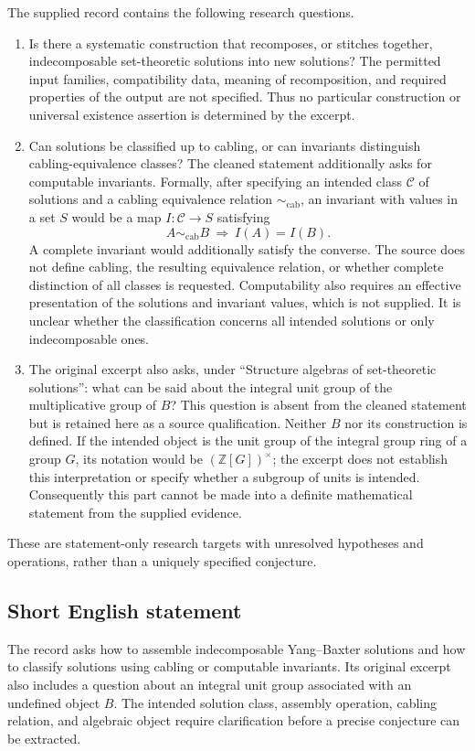 \documentclass[11pt]{article}
\begin{document}
The supplied record contains the following research questions.
\begin{enumerate}
\item Is there a systematic construction that recomposes, or stitches together, indecomposable set-theoretic solutions into new solutions? The permitted input families, compatibility data, meaning of recomposition, and required properties of the output are not specified. Thus no particular construction or universal existence assertion is determined by the excerpt.
\item Can solutions be classified up to cabling, or can invariants distinguish cabling-equivalence classes? The cleaned statement additionally asks for computable invariants. Formally, after specifying an intended class \(\mathcal C\) of solutions and a cabling equivalence relation \(\sim_{\mathrm{cab}}\), an invariant with values in a set \(S\) would be a map \(I:\mathcal C\to S\) satisfying
\[
A\sim_{\mathrm{cab}}B\ \Longrightarrow\ I(A)=I(B).
\]
A complete invariant would additionally satisfy the converse. The source does not define cabling, the resulting equivalence relation, or whether complete distinction of all classes is requested. Computability also requires an effective presentation of the solutions and invariant values, which is not supplied. It is unclear whether the classification concerns all intended solutions or only indecomposable ones.
\item The original excerpt also asks, under ``Structure algebras of set-theoretic solutions'': what can be said about the integral unit group of the multiplicative group of \(B\)? This question is absent from the cleaned statement but is retained here as a source qualification. Neither \(B\) nor its construction is defined. If the intended object is the unit group of the integral group ring of a group \(G\), its notation would be \((\mathbb Z[G])^\times\); the excerpt does not establish this interpretation or specify whether a subgroup of units is intended. Consequently this part cannot be made into a definite mathematical statement from the supplied evidence.
\end{enumerate}
These are statement-only research targets with unresolved hypotheses and operations, rather than a uniquely specified conjecture.
\subsection{Short English statement}
The record asks how to assemble indecomposable Yang--Baxter solutions and how to classify solutions using cabling or computable invariants. Its original excerpt also includes a question about an integral unit group associated with an undefined object \(B\). The intended solution class, assembly operation, cabling relation, and algebraic object require clarification before a precise conjecture can be extracted.
\end{document}
